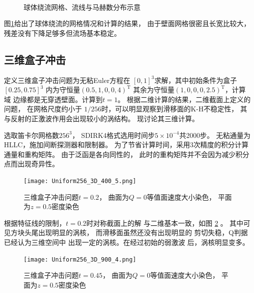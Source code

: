 \documentclass[UTF8,zihao=5]{ctexart} %
\newcommand{\trans}[0]{^\mathrm{T}}
\begin{document}
\begin{figure}[htbp]
    \centering
    \\
    \caption{球体绕流网格、流线与马赫数分布示意}
    \label{fig:BallRe1000_C}
\end{figure}

图\ref{fig:BallRe1000_C}给出了球体绕流的网格情况和计算的结果，
由于壁面网格很密且长宽比较大，残差没有下降足够多但流场基本稳定。



\subsection{三维盒子冲击}

定义三维盒子冲击问题为无粘Euler方程在
$[0,1]^3$求解，其中初始条件为盒子$[0.25,0.75]^3$
内为守恒量$(0.5,1,0,0,4)\trans$
其余为守恒量$(1,0,0,0,2.5)\trans$，计算域
边缘都是无穿透壁面。计算到$t=1$。
根据二维计算的结果，二维截面上定义的问题，
在网格尺度约小于
$1/256$时，可以明显观察到滑移面的K-H不稳定性，
其与反射的正激波作用会出现较小的涡结构。
现讨论其三维计算。

选取笛卡尔网格数$256^3$，
SDIRK4格式选用时间步$5\times10^{-4}$共2000步。
无粘通量为HLLC，施加间断探测器和限制器。
为了节省计算时间，采用3次精度的积分计算通量和重构矩阵。
由于泛函是各向同性的，
此时的重构矩阵并不会因为减少积分点而出现奇异性。

\begin{figure}[htbp]
    \centering
    \texttt{[image: Uniform256\_3D\_400\_5.png]}  %
    \caption{三维盒子冲击问题$t=0.2$，
        曲面为$Q=0$等值面速度大小染色，
        平面为$z=0.5$密度染色}
    \label{fig:Uniform256_3D_400_5}
\end{figure}

根据特征线的限制，$t=0.2$时对称截面上的解
与二维基本一致，如图
\ref{fig:Uniform256_3D_400_5}
。
其中可见方块头尾出现明显的涡核，
而滑移面虽然还没有出现明显的
剪切失稳，Q判据已经认为三维空间中
出现一定的涡核。在经过初始的弱激波
后，涡核明显变多。

\begin{figure}[htbp]
    \centering
    \texttt{[image: Uniform256\_3D\_900\_4.png]}  %
    \caption{三维盒子冲击问题$t=0.45$，
        曲面为$Q=0$等值面速度大小染色，
        平面为$z=0.5$密度染色}
    \label{fig:Uniform256_3D_900_4}
\end{figure}
\end{document}
